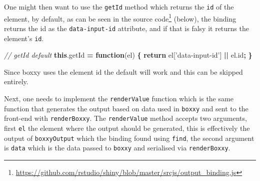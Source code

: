 \documentclass[10pt,]{krantz}
\makeatletter
\newenvironment{Shaded}{\begin{snugshade}}{\end{snugshade}}
\newcommand{\AttributeTok}[1]{\textcolor[rgb]{0.61,0.61,0.61}{#1}}
\newcommand{\CommentTok}[1]{\textcolor[rgb]{0.37,0.37,0.37}{\textit{#1}}}
\newcommand{\ControlFlowTok}[1]{\textcolor[rgb]{0.27,0.27,0.27}{\textbf{#1}}}
\newcommand{\DataTypeTok}[1]{\textcolor[rgb]{0.27,0.27,0.27}{#1}}
\newcommand{\KeywordTok}[1]{\textcolor[rgb]{0.27,0.27,0.27}{\textbf{#1}}}
\newcommand{\NormalTok}[1]{#1}
\newcommand{\OperatorTok}[1]{\textcolor[rgb]{0.43,0.43,0.43}{\textbf{#1}}}
\newcommand{\StringTok}[1]{\textcolor[rgb]{0.5,0.5,0.5}{#1}}
\newcommand{\VariableTok}[1]{\textcolor[rgb]{0,0,0}{#1}}
\renewcommand{\href}[2]{#2\footnote{\url{#1}}}
\newenvironment{kframe}{%
\medskip{}
\setlength{\fboxsep}{.8em}
 \def\at@end@of@kframe{}%
 \ifinner\ifhmode%
  \def\at@end@of@kframe{\end{minipage}}%
  \begin{minipage}{\columnwidth}%
 \fi\fi%
 \def\FrameCommand##1{\hskip\@totalleftmargin \hskip-\fboxsep
 \colorbox{shadecolor}{##1}\hskip-\fboxsep
     \hskip-\linewidth \hskip-\@totalleftmargin \hskip\columnwidth}%
 \MakeFramed {\advance\hsize-\width
   \@totalleftmargin\z@ \linewidth\hsize
   \@setminipage}}%
 {\par\unskip\endMakeFramed%
 \at@end@of@kframe}
\renewenvironment{Shaded}{\begin{kframe}}{\end{kframe}}
\makeatother
\begin{document}
\begin{Shaded}
\end{Shaded}

One might then want to use the \texttt{getId} method which returns the \texttt{id} of the element, by default, as can be seen in the \href{https://github.com/rstudio/shiny/blob/master/srcjs/output_binding.js}{source code} (below), the binding returns the id as the \texttt{data-input-id} attribute, and if that is falsy it returns the element's \texttt{id}.

\begin{Shaded}
\begin{Highlighting}[]
\CommentTok{// getId default}
\KeywordTok{this}\NormalTok{.}\AttributeTok{getId} \OperatorTok{=} \KeywordTok{function}\NormalTok{(el) }\OperatorTok{\{}
  \ControlFlowTok{return}\NormalTok{ el[}\StringTok{'data-input-id'}\NormalTok{] }\OperatorTok{||} \VariableTok{el}\NormalTok{.}\AttributeTok{id}\OperatorTok{;}
\OperatorTok{\}}
\end{Highlighting}
\end{Shaded}

Since boxxy uses the element id the default will work and this can be skipped entirely.

Next, one needs to implement the \texttt{renderValue} function which is the same function that generates the output based on data used in \texttt{boxxy} and sent to the front-end with \texttt{renderBoxxy}. The \texttt{renderValue} method accepts two arguments, first \texttt{el} the element where the output should be generated, this is effectively the output of \texttt{boxxyOutput} which the binding found using \texttt{find}, the second argument is \texttt{data} which is the data passed to \texttt{boxxy} and serialised via \texttt{renderBoxxy}.
\end{document}
